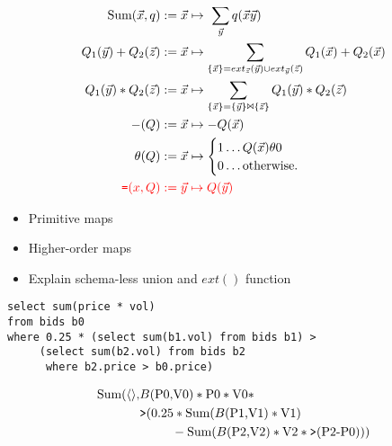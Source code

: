 \begin{align*}
\mbox{Sum}(\vec{x}, q) := & \;
\vec{x} \mapsto \ \sum_{\vec{y}} q(\vec{x}\vec{y})
\\
Q_1(\vec{y}) + Q_2(\vec{z}) := & \;
\vec{x} \mapsto 
\sum_{\{\vec{x}\} = ext_{\vec{z}}(\vec{y}) \cup ext_{\vec{y}}(\vec{z})}
Q_1(\vec{x}) + Q_2(\vec{x})
\\
Q_1(\vec{y}) * Q_2(\vec{z}) := & \;
\vec{x} \mapsto \sum_{ \{\vec{x}\} = \{\vec{y}\} \Join \{\vec{z}\} }
Q_1(\vec{y}) * Q_2(\vec{z})
\\
-(Q) := & \; \vec{x} \mapsto -Q(\vec{x})
\\
\theta(Q) := & \; \vec{x} \mapsto
                    \begin{cases}
                    1 \ldots Q(\vec{x}) \theta 0\\
                    0 \ldots \mbox{otherwise.}
                    \end{cases}
\\
\textcolor{red}{\mbox{{\tt =}}(x,Q) :=} & \;
\textcolor{red}{\vec{y} \mapsto Q(\vec{y})}
\end{align*}

\begin{itemize}
  \item Primitive maps
  \item Higher-order maps
  \item Explain schema-less union and $ext()$ function
\end{itemize}


\begin{verbatim}
select sum(price * vol)
from bids b0
where 0.25 * (select sum(b1.vol) from bids b1) >
     (select sum(b2.vol) from bids b2
      where b2.price > b0.price)
\end{verbatim}

\begin{align*}
\mbox{Sum}({\langle\rangle},
& B(\mbox{P0,V0}) * \mbox{P0} * \mbox{V0} *\\
& \mbox{{\tt >}}(0.25 * \mbox{Sum}(B(\mbox{P1,V1}) * \mbox{V1}) \\
& \qquad \; \; - \mbox{Sum}(B(\mbox{P2,V2}) * \mbox{V2} * \mbox{{\tt >}}(\mbox{P2-P0})))
\end{align*}


